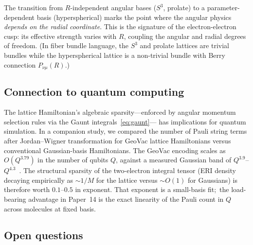 \documentclass[aps,pra,twocolumn,superscriptaddress,longbibliography]{revtex4-2}
\begin{document}
The transition from $R$-independent angular bases ($S^3$, prolate) to
a parameter-dependent basis (hyperspherical) marks the point where the
angular physics \emph{depends on the radial coordinate}.  This is the
signature of the electron-electron cusp: its effective strength varies
with $R$, coupling the angular and radial degrees of freedom.
(In fiber bundle language, the $S^3$ and prolate lattices are trivial
bundles while the hyperspherical lattice is a non-trivial bundle with
Berry connection $P_{\nu\mu}(R)$.)

\subsection{Connection to quantum computing}

The lattice Hamiltonian's algebraic sparsity---enforced by angular
momentum selection rules via the Gaunt integrals~\eqref{eq:gaunt}---
has implications for quantum simulation.  In a companion study, we
compared the number of Pauli string terms after Jordan--Wigner
transformation for GeoVac lattice Hamiltonians versus conventional
Gaussian-basis Hamiltonians.  The GeoVac encoding scales as
$O(Q^{3.79})$ in the number of qubits $Q$, against a measured
Gaussian band of $Q^{3.9}$--$Q^{4.3}$~\cite{loutey_paper14}.  The
structural sparsity of the two-electron integral tensor (ERI density
decaying empirically as $\sim 1/M$ for the lattice versus $\sim O(1)$
for Gaussians) is therefore worth $0.1$--$0.5$ in exponent.  That
exponent is a small-basis fit;\ the load-bearing advantage in
Paper~14 is the exact linearity of the Pauli count in $Q$ across
molecules at fixed basis.

\subsection{Open questions}
\end{document}
